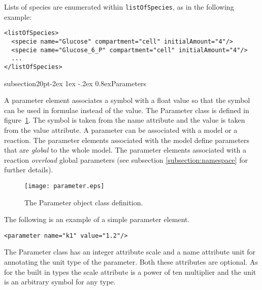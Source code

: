 \documentclass[10pt]{article}
\makeatletter
\renewcommand{\subsection}{\@startsection%
  {subsection}{2}{0pt}{-2ex \@plus 1ex \@minus -.2ex}%
  {0.8ex}{\slshape\large\bfseries}}
\newcommand{\tightspacing}{\renewcommand{\baselinestretch}{0.85}}
\newcommand{\regularspacing}{\renewcommand{\baselinestretch}{1.0}}
\newcommand{\class}[1]{\textsf{#1}}
\newcommand{\attrib}[1]{\textsf{#1}}
\makeatother
\begin{document}
Lists of species are enumerated within {\tt listOfSpecies},
as in the following example:

\begin{small}
\tightspacing
\begin{verbatim}
<listOfSpecies>
  <specie name="Glucose" compartment="cell" initialAmount="4"/>
  <specie name="Glucose_6_P" compartment="cell" initialAmount="4"/>
  ...
</listOfSpecies>
\end{verbatim}
\regularspacing
\end{small}


\subsection{Parameters}

A \class{parameter} element associates a symbol with a float value
so that the symbol can be used in formulae instead of the value.
The \class{Parameter} class is defined in
figure~\ref{fig:parameter}. The symbol is taken from the
\attrib{name} attribute and the value is taken from the
\attrib{value} attribute.  A parameter can be associated with a
model or a reaction.  The parameter elements associated with the
model define parameters that are {\em global} to the whole model.
The parameter elements associated with a reaction {\em overload}
global parameters (see subsection \ref{subsection:namespace} for
further details).

\begin{figure}[h]
  \centering
  \texttt{[image: parameter.eps]}
  \caption{The \class{Parameter} object class definition.}
  \label{fig:parameter}
\end{figure}

The following is an example of a simple \class{parameter} element.
\begin{small}
\tightspacing
\begin{verbatim}
<parameter name="k1" value="1.2"/>
\end{verbatim}
\regularspacing
\end{small}

The \class{Parameter} class has an integer attribute
\attrib{scale} and a name attribute \attrib{unit} for annotating
the unit type of the parameter.  Both these attributes are
optional.  As for the built in types the \attrib{scale} attribute
is a power of ten multiplier and the \attrib{unit} is an
arbitrary symbol for any type.
\end{document}

